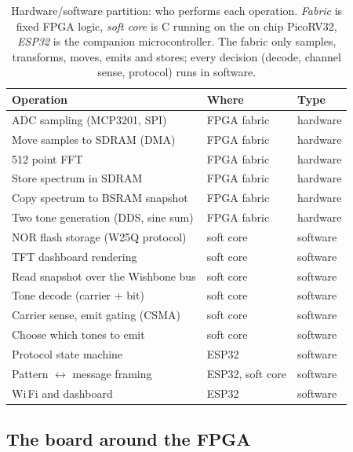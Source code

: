 \documentclass[a4paper,11pt]{article}
\begin{document}
\begin{table}[H]
\centering
\caption{Hardware/software partition: who performs each operation. \emph{Fabric} is
fixed FPGA logic, \emph{soft core} is C running on the on chip PicoRV32, \emph{ESP32}
is the companion microcontroller. The fabric only samples, transforms, moves, emits
and stores; every decision (decode, channel sense, protocol) runs in software.}
\label{tab:partition}
\begin{tabular}{lll}
\toprule
\textbf{Operation} & \textbf{Where} & \textbf{Type} \\
\midrule
ADC sampling (MCP3201, SPI)              & FPGA fabric        & hardware \\
Move samples to SDRAM (DMA)              & FPGA fabric        & hardware \\
512 point FFT                           & FPGA fabric        & hardware \\
Store spectrum in SDRAM                  & FPGA fabric        & hardware \\
Copy spectrum to BSRAM snapshot          & FPGA fabric        & hardware \\
Two tone generation (DDS, sine sum)      & FPGA fabric        & hardware \\
NOR flash storage (W25Q protocol)        & soft core          & software \\
TFT dashboard rendering                  & soft core          & software \\
Read snapshot over the Wishbone bus      & soft core          & software \\
Tone decode (carrier + bit)              & soft core          & software \\
Carrier sense, emit gating (CSMA)        & soft core          & software \\
Choose which tones to emit               & soft core          & software \\
Protocol state machine                   & ESP32              & software \\
Pattern $\leftrightarrow$ message framing & ESP32, soft core  & software \\
Wi\,Fi and dashboard                     & ESP32              & software \\
\bottomrule
\end{tabular}
\end{table}

\subsection{The board around the FPGA}
\label{sec:board}
\end{document}
